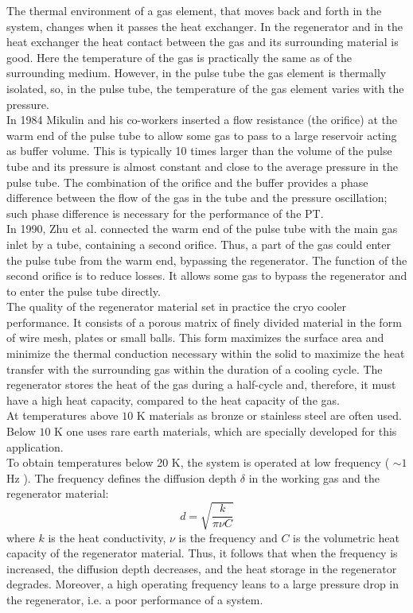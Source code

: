 {The thermal environment of a gas element, that moves back and forth in the system, changes when it passes the heat exchanger. In the regenerator and in the heat exchanger the heat contact between the gas and its surrounding material is good. Here the temperature of the gas is practically the same as of the surrounding medium. However, in the pulse tube the gas element is thermally isolated, so, in the pulse tube, the temperature of the gas element varies with the pressure.\\
In 1984 Mikulin and his co-workers \cite{Mikulin} inserted a flow resistance (the orifice)  at the warm end of the pulse tube to allow some gas to pass to a large reservoir acting as buffer volume. This is typically 10 times larger than the volume of the pulse tube and its pressure is almost constant and close to the average pressure in the pulse tube. The combination of the orifice and the buffer provides a phase difference between the flow of the gas in the tube and the pressure oscillation; such phase difference is necessary for the performance of the PT.\\
In 1990, Zhu et al. \cite{Zhu} connected the warm end of the pulse tube with the main gas inlet by a tube, containing a second orifice. Thus, a part of the gas could enter the pulse tube from the warm end, bypassing the regenerator. The function of the second orifice  is to reduce losses. It allows some gas to bypass the regenerator and to enter the pulse tube directly.\\
The quality of the regenerator material set in practice the cryo cooler performance. It consists of a porous matrix of finely divided material in the form of wire mesh, plates or small balls. This form  maximizes the surface area and minimize the thermal conduction necessary within the solid to maximize the heat transfer with the surrounding gas within the duration of a cooling cycle. The regenerator stores the heat of the gas during a half-cycle and, therefore, it must have a high heat capacity, compared to the heat capacity of the gas.\\
At temperatures above $10$ K  materials as bronze or stainless steel  are often used.  Below $10$ K one uses rare earth materials, which are specially developed for this application.\\
To obtain temperatures below 20 K, the system is  operated at low frequency ( $\sim 1$ Hz ).
The frequency defines the diffusion depth $\delta$ in the working gas and the regenerator material:
$$d = \sqrt{\frac {k}{\pi \nu C}}$$
\noindent
where $k$ is the heat conductivity, $\nu$ is the frequency and $C$ is the volumetric heat capacity of the regenerator material. Thus, it follows that when the frequency is increased, the diffusion depth decreases, and the heat storage in the regenerator degrades.
Moreover, a high operating frequency leans to a large pressure drop in the regenerator, i.e. a poor performance of a system.}



